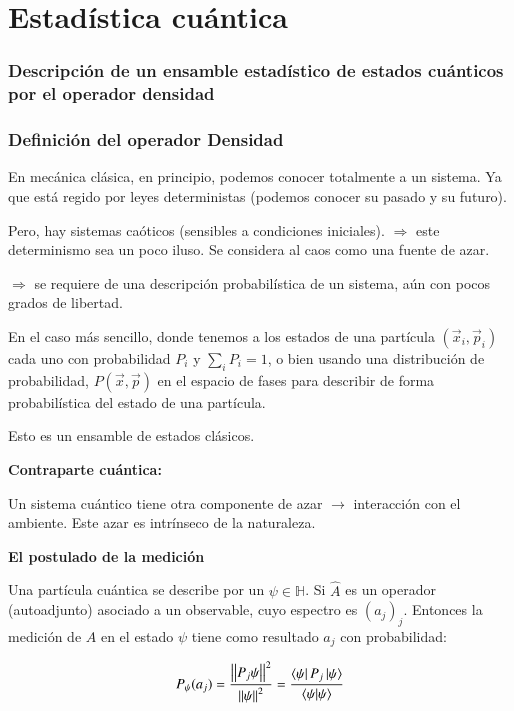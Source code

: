 \chapter{Estadística cuántica}

\subsection{Descripción de un ensamble estadístico de estados cuánticos por el operador densidad}

\subsection{Definición del operador Densidad}

En mecánica clásica, en principio, podemos conocer totalmente a un sistema. Ya que está regido por leyes deterministas (podemos conocer su pasado y su futuro).

Pero, hay sistemas caóticos (sensibles a condiciones iniciales). $\Rightarrow$ este determinismo sea un poco iluso. Se considera al caos como una fuente de azar.

$\Rightarrow$ se requiere de una descripción probabilística de un sistema, aún con pocos grados de libertad.

En el caso más sencillo, donde tenemos a los estados de una partícula $(\vec{x}_i,\vec{p}_i)$ cada uno con probabilidad $P_i$ y $\sum_i P_i =1$, o bien usando una distribución de probabilidad, $P(\vec{x},\vec{p})$ en el espacio de fases para describir de forma probabilística del estado de una partícula.

Esto es un ensamble de estados clásicos.

\bigskip

\textbf{Contraparte cuántica:}

Un sistema cuántico tiene otra componente de azar $\rightarrow$ interacción con el ambiente. Este azar es intrínseco de la naturaleza.

\bigskip

\textbf{El postulado de la medición}

Una partícula cuántica se describe por un $\psi\in\mathbb{H}$. Si $\hat{A}$ es un operador (autoadjunto) asociado a un observable, cuyo espectro es $(a_j)_j$. Entonces la medición de $A$ en el estado $\psi$ tiene como resultado $a_j$ con probabilidad:

\begin{align*}
    P_\psi(a_j)=\frac{\abs{\abs{P_j\psi}}^2}{\abs{\abs{\psi}}^2}=\frac{\bra{\psi}P_j\ket{\psi}}{\bra{\psi}\ket{\psi}}
\end{align*}

